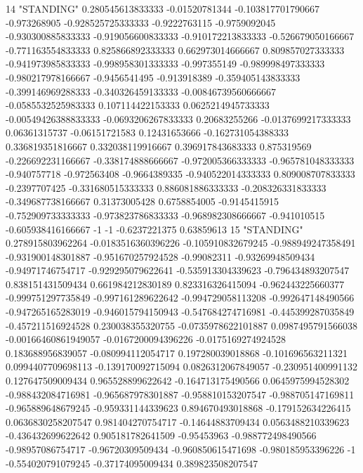14 "STANDING" 0.280545613833333 -0.01520781344 -0.103817701790667 -0.973268905 -0.928525725333333 -0.9222763115 -0.9759092045 -0.930300885833333 -0.919056600833333 -0.910172213833333 -0.526679050166667 -0.771163554833333 0.825866892333333 0.662973014666667 0.809857027333333 -0.941973985833333 -0.998958301333333 -0.997355149 -0.989998497333333 -0.980217978166667 -0.9456541495 -0.913918389 -0.359405143833333 -0.399146969288333 -0.340326459133333 -0.00846739560666667 -0.0585532525983333 0.107114422153333 0.0625214945733333 -0.00549426388833333 -0.0693206267833333 0.20683255266 -0.0137699217333333 0.06361315737 -0.06151721583 0.12431653666 -0.162731054388333 0.336819351816667 0.332038119916667 0.396917843683333 0.875319569 -0.226692231166667 -0.338174888666667 -0.972005366333333 -0.965781048333333 -0.940757718 -0.972563408 -0.9664389335 -0.940522014333333 0.809008707833333 -0.2397707425 -0.331680515333333 0.886081886333333 -0.208326331833333 -0.349687738166667 0.31373005428 0.6758854005 -0.9145415915 -0.752909733333333 -0.973823786833333 -0.968982308666667 -0.941010515 -0.605938416166667 -1 -1 -0.6237221375 0.63859613
15 "STANDING" 0.278915803962264 -0.0183516360396226 -0.105910832679245 -0.988949247358491 -0.931900148301887 -0.951670257924528 -0.99082311 -0.93269948509434 -0.94971746754717 -0.929295079622641 -0.535913304339623 -0.796434893207547 0.838151431509434 0.661984212830189 0.823316326415094 -0.962443225660377 -0.999751297735849 -0.997161289622642 -0.994729058113208 -0.992647148490566 -0.947265165283019 -0.946015794150943 -0.547684274716981 -0.445399287035849 -0.457211516924528 0.230038355320755 -0.0735978622101887 0.0987495791566038 -0.00166460861949057 -0.0167200094396226 -0.0175169274924528 0.183688956839057 -0.080994112054717 0.197280039018868 -0.101696563211321 0.0994407709698113 -0.139170092715094 0.0826312067849057 -0.230951400991132 0.127647509009434 0.965528899622642 -0.164713175490566 0.0645975994528302 -0.988432084716981 -0.965687978301887 -0.958810153207547 -0.988705147169811 -0.965889648679245 -0.959331144339623 0.894670493018868 -0.179152634226415 0.0636830258207547 0.981404270754717 -0.14644883709434 0.0563488210339623 -0.436432699622642 0.905181782641509 -0.95453963 -0.988772498490566 -0.98957086754717 -0.96720309509434 -0.960850615471698 -0.980185953396226 -1 -0.554020791079245 -0.37174095009434 0.389823508207547
